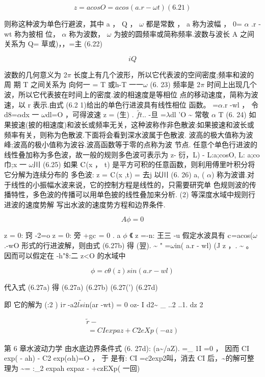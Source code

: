 \[z = acosO = acos( a.r - \omega  t) (6.2 1)\]

则称这种波为单色行避波，其中 a ， Q ， $\omega$ 都是常数 ， a 称为波幅 ， 0= $\alpha$ .r - wt 称为披相 位， $\alpha$ 称为波数， $\omega$ 为披的圆频率或简称频率.波数与波长 A 之间关系为 Q= 草或)，，=主 (6.22)

\[i  Q\]

波数的几何意义为 2$\pi$ 长度上有几个波形，所以它代表波的空间密度;频率和波的周 期 T 之间关系为 向何一 = T 或h-T 一一$\omega$ (6. 23) 频率是 2$\pi$ 时间上出现几个波，所以它代表披在时间上的密度.波的相速度是等相位 点的移动速度，简称为波速，以 r 表示.由式 (6.2 1)给出的单色行进波具有线性相位 函数。 =$\alpha$.r -wl ， 令 d8=$\alpha$dx 一 $\omega$dl=O ，可得波速 z = (生) . $\tilde{ft}$.. -旦 =$\lambda$dl 'O \textasciitilde{} 常敬 $\alpha$ T (6. 24) 如果披速(披的相速度)和波长或频率无关，这种波称作非色散波:如果披速和波长或 频率有关，则称为色散波.下面将会看到深水波属于色散波. 波高的极大值称为波峰;波高的极小值称为波谷.波高函数等于零的点称为波 节点. 任意个单色行进波的线性叠加称为多色波，故一般的规则多色波可表示为 z- 衍，L) - L:a;cosO, L: a;co 巾;x 一 $\omega$川 (6.25) 如果 ${\rm C}$(x ， t) 是平方可积的任意函数，则利用傅里叶积分将它分解为连续分布的 多色波: z = ${\rm C}$(x ,t) = 去j 以川 (6. 26) a, ( $\alpha$) 称为波谱.对于线性的小振幅水波来说，它的控制方程是线性的，只需要研究单 色规则波的传播特性，多色波的传播可以用单色披的线性叠加来分析. (2) 等深度水域中规则行进波的速度势解 写出水波的速度势方程和边界条件.

\[A\phi =0\]

z = 0: 窍 -2=o z = 0: 旁 +g${\rm c}$ = 0 . a $\phi$ 《 z =-n: 王三 -u 假定水波具有 ${\rm c}$=acos($\omega$.-wO 形式的行进波解，则由式 (6.27b) 得 (翌). \textasciitilde{} " =$\omega$in( a.r - wl) (J z ，. \textasciitilde{} 。 因而可以假定在 -h"\$:二 z<O 的水域中

\[\phi = c\theta ( z) sin( a.r - wl )\]

代入式 (6.27a) 得 (6.27a) (6.27b) (6.27(') (6.27d)

即 它的解为 (:2 ) i$\tau$ -a2$\tilde{lsi}$n(ar -wt) = 0 oz- I d2\textasciitilde{} \_ ..2 ..1. dz 2

\begin{gather*}
\tilde{r} -\\
~ = CI expaz + C2eXp(- az)
\end{gather*}

第 6 章水波动力学 由水底边界条件式 (6. 27d): (a\textasciitilde{}/aZ). =\_ 1I =0 ， 因而 CI exp( - ah) - C2 exp($\alpha$h)=O ， 于 是有: CI =c2exp2叫，消去 CI 后，\textasciitilde{}的解可整理为 \textasciitilde{}= :\_2 expah expaz - +czEXp( 一回)

